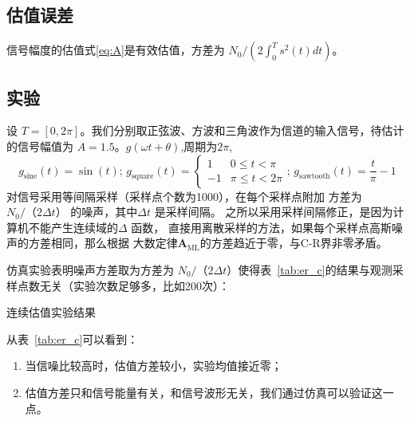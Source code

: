\documentclass{ctexart}
\begin{document}
\subsection{估值误差}
信号幅度的估值式\eqref{eq:A}是有效估值，方差为 $ N_0 / \left(2 \int_0^T s^2(t)dt \right)$。

\subsection{实验}
设 $T=[0,2\pi]$。我们分别取正弦波、方波和三角波作为信道的输入信号，待估计的信号幅值为 $A=1.5$。$g(\omega t + \theta)$,周期为$2\pi$,
$$
g_{\textrm{sine}}(t) = \sin(t); \,
g_{\textrm{square}}(t)  = \begin{cases} 1 & 0\leq t< \pi \\ -1 & \pi\leq t < 2\pi \end{cases};\,
g_{\textrm{sawtooth}}(t) = \frac{t}{\pi} - 1
$$  
对信号采用等间隔采样（采样点个数为1000），在每个采样点附加 方差为 $N_0/（2\Delta t）$ 的噪声，其中$\Delta t$ 是采样间隔。
之所以采用采样间隔修正，是因为计算机不能产生连续域的$\Delta$ 函数， 直接用离散采样的方法，如果每个采样点高斯噪声的方差相同，那么根据
大数定律$\bm{A}_{\textrm{ML}}$的方差趋近于零，与C-R界非零矛盾。 

仿真实验表明噪声方差取为方差为 $N_0/（2\Delta t）$使得表~\ref{tab:er_c}的结果与观测采样点数无关（实验次数足够多，比如200次）：

\begin{table}[!ht]
    \centering
    \caption{连续估值实验结果}\label{tab:er_c}

\end{table}

从表~\ref{tab:er_c}可以看到：
\begin{enumerate}
\item 当信噪比较高时，估值方差较小，实验均值接近零；
\item 估值方差只和信号能量有关，和信号波形无关，我们通过仿真可以验证这一点。
\end{enumerate}
\end{document}
